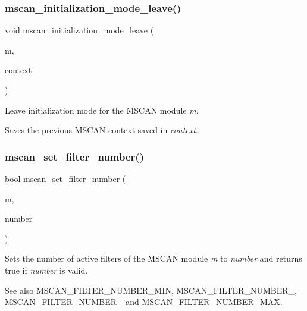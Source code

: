 \subsubsection{\texorpdfstring{mscan\_initialization\_mode\_leave()}{mscan\_initialization\_mode\_leave()}}
{\footnotesize\ttfamily void mscan\+\_\+initialization\+\_\+mode\+\_\+leave (\begin{DoxyParamCaption}\item[{volatile \mbox{\hyperlink{group__RTEMSBSPsPowerPCGen5200MSCAN_gacfd56a4a482c5e7da2cff003284b2d51}{mscan}} $\ast$}]{m,  }\item[{const \mbox{\hyperlink{structmscan__context}{mscan\+\_\+context}} $\ast$}]{context }\end{DoxyParamCaption})}



Leave initialization mode for the M\+S\+C\+AN module {\itshape m}. 

Saves the previous M\+S\+C\+AN context saved in {\itshape context}. \mbox{\label{group__RTEMSBSPsPowerPCGen5200MSCAN_gab1e2410b46710969d0b6c886e1eb4eb4}} 
\subsubsection{\texorpdfstring{mscan\_set\_filter\_number()}{mscan\_set\_filter\_number()}}
{\footnotesize\ttfamily bool mscan\+\_\+set\+\_\+filter\+\_\+number (\begin{DoxyParamCaption}\item[{volatile \mbox{\hyperlink{group__RTEMSBSPsPowerPCGen5200MSCAN_gacfd56a4a482c5e7da2cff003284b2d51}{mscan}} $\ast$}]{m,  }\item[{unsigned}]{number }\end{DoxyParamCaption})}



Sets the number of active filters of the M\+S\+C\+AN module {\itshape m} to {\itshape number} and returns true if {\itshape number} is valid. 

\begin{DoxySeeAlso}{See also}
M\+S\+C\+A\+N\+\_\+\+F\+I\+L\+T\+E\+R\+\_\+\+N\+U\+M\+B\+E\+R\+\_\+\+M\+IN, M\+S\+C\+A\+N\+\_\+\+F\+I\+L\+T\+E\+R\+\_\+\+N\+U\+M\+B\+E\+R\+\_, M\+S\+C\+A\+N\+\_\+\+F\+I\+L\+T\+E\+R\+\_\+\+N\+U\+M\+B\+E\+R\+\_ and M\+S\+C\+A\+N\+\_\+\+F\+I\+L\+T\+E\+R\+\_\+\+N\+U\+M\+B\+E\+R\+\_\+\+M\+AX. 
\end{DoxySeeAlso}
